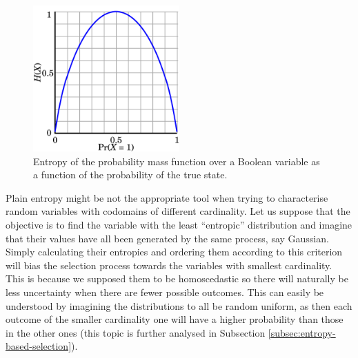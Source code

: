 \begin{figure}[htbp]
\centerline{\includegraphics[width=0.5\textwidth]{mathematical-background/images/entropy-plot}}
\caption{Entropy of the probability mass function over a Boolean variable as a function of the probability of the true state.}
\label{fig:entropy-plot}
\end{figure}

Plain entropy might be not the appropriate tool when trying to characterise random variables with codomains of different cardinality.
Let us suppose that the objective is to find the variable with the least \enquote{entropic} distribution and imagine that their values have all been generated by the same process, say Gaussian.
Simply calculating their entropies and ordering them according to this criterion will bias the selection process towards the variables with smallest cardinality.
This is because we supposed them to be homoscedastic so there will naturally be less uncertainty when there are fewer possible outcomes.
This can easily be understood by imagining the distributions to all be random uniform, as then each outcome of the smaller cardinality one will have a higher probability than those in the other ones (this topic is further analysed in Subsection \ref{subsec:entropy-based-selection}).

